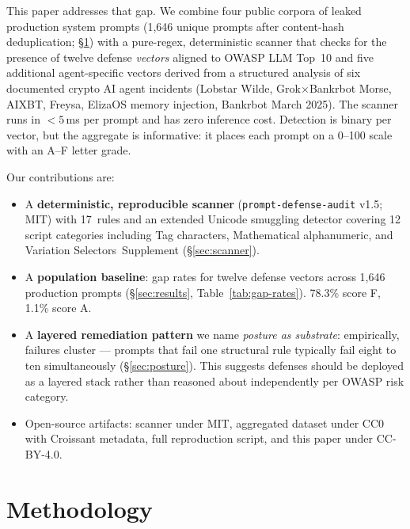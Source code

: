 \documentclass[10pt,letterpaper]{article}
\begin{document}
This paper addresses that gap. We combine four public corpora of
leaked production system prompts (1{,}646 unique prompts after
content-hash deduplication; \S\ref{sec:methodology}) with a pure-regex,
deterministic scanner that checks for the presence of twelve defense
\emph{vectors} aligned to OWASP LLM Top~10 and five additional
agent-specific vectors derived from a structured analysis of six
documented crypto AI agent incidents (Lobstar Wilde,
Grok$\times$Bankrbot Morse, AIXBT, Freysa, ElizaOS memory injection,
Bankrbot March 2025). The scanner runs in $<\!5$\,ms per prompt and
has zero inference cost. Detection is binary per vector, but the
aggregate is informative: it places each prompt on a 0--100 scale
with an A--F letter grade.

Our contributions are:
\begin{itemize}[leftmargin=*,topsep=2pt,itemsep=0pt]
  \item A \textbf{deterministic, reproducible scanner}
  (\texttt{prompt-defense-audit} v1.5; MIT) with 17~rules and an
  extended Unicode smuggling detector covering 12 script categories
  including Tag characters, Mathematical alphanumeric, and Variation
  Selectors~Supplement (\S\ref{sec:scanner}).
  \item A \textbf{population baseline}: gap rates for twelve defense
  vectors across 1{,}646 production prompts (\S\ref{sec:results},
  Table~\ref{tab:gap-rates}). 78.3\% score F, 1.1\% score A.
  \item A \textbf{layered remediation pattern} we name
  \emph{posture as substrate}: empirically, failures cluster --- prompts
  that fail one structural rule typically fail eight to ten
  simultaneously (\S\ref{sec:posture}). This suggests defenses
  should be deployed as a layered stack rather than reasoned about
  independently per OWASP risk category.
  \item Open-source artifacts: scanner under MIT, aggregated dataset
  under CC0 with Croissant metadata, full reproduction script, and
  this paper under CC-BY-4.0.
\end{itemize}

\section{Methodology}\label{sec:methodology}
\end{document}
